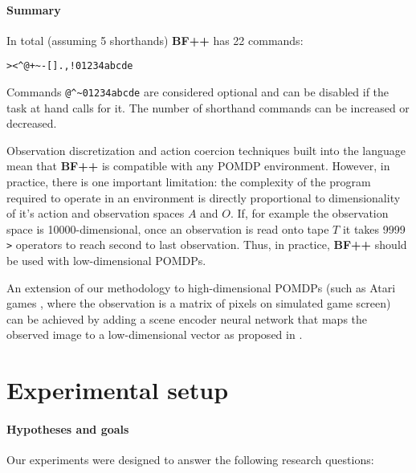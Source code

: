 \paragraph{Summary}
\label{sec:summary}

In total (assuming 5 shorthands) \textbf{BF++} has 22 commands:

\begin{center}
\begin{lstlisting}
><^@+~-[].,!01234abcde
\end{lstlisting}
\end{center}

Commands \verb|@^~01234abcde| are considered optional and can be disabled if the task at hand calls for it.
The number of shorthand commands can be increased or decreased.

Observation discretization and action coercion techniques built into the language mean that \textbf{BF++} is compatible with any POMDP environment. 
However, in practice, there is one important limitation: the complexity of the program required to operate in an environment is directly proportional to dimensionality of it's action and observation spaces $A$ and $O$. 
If, for example the observation space is 10000-dimensional, once an observation is read onto tape $T$ it takes 9999 \verb|>| operators to reach second to last observation.
Thus, in practice, \textbf{BF++} should be used with low-dimensional POMDPs.

An extension of our methodology to high-dimensional POMDPs (such as Atari games \cite{atari}, where the observation is a matrix of pixels on simulated game screen) can be achieved by adding a scene encoder neural network that maps the observed image to a low-dimensional vector as proposed in \cite{daqn}.

\newpage
\section{Experimental setup}
\label{sec:bfpp-experiments}

\paragraph{Hypotheses and goals}
\label{sec:exgoals}

Our experiments were designed to answer the following research questions:


